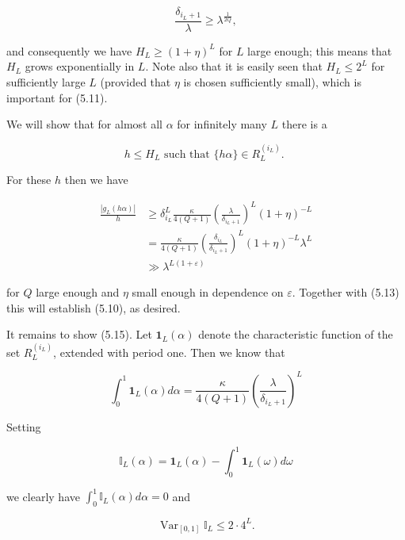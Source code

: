 \documentclass[10pt]{article}
\newcommand{\1}{\mathbf{1}}
\begin{document}
$$
\frac{\delta_{i_{L}+1}}{\lambda} \geqslant \lambda^{\frac{1}{2 Q}},
$$

and consequently we have $H_{L} \geqslant(1+\eta)^{L}$ for $L$ large enough; this means that $H_{L}$ grows exponentially in $L$. Note also that it is easily seen that $H_{L} \leqslant 2^{L}$ for sufficiently large $L$ (provided that $\eta$ is chosen sufficiently small), which is important for (5.11).

We will show that for almost all $\alpha$ for infinitely many $L$ there is a


\begin{equation*}
h \leqslant H_{L} \text { such that }\{h \alpha\} \in R_{L}^{\left(i_{L}\right)} \text {. } \tag{5.15}
\end{equation*}


For these $h$ then we have

$$
\begin{aligned}
\frac{\left|g_{L}(h \alpha)\right|}{h} & \geqslant \delta_{i_{L}}^{L} \frac{\kappa}{4(Q+1)}\left(\frac{\lambda}{\delta_{i_{L}+1}}\right)^{L}(1+\eta)^{-L} \\
& =\frac{\kappa}{4(Q+1)}\left(\frac{\delta_{i_{L}}}{\delta_{i_{L}+1}}\right)^{L}(1+\eta)^{-L} \lambda^{L} \\
& \gg \lambda^{L(1+\varepsilon)}
\end{aligned}
$$

for $Q$ large enough and $\eta$ small enough in dependence on $\varepsilon$. Together with (5.13) this will establish (5.10), as desired.

It remains to show (5.15). Let $\mathbf{1}_{L}(\alpha)$ denote the characteristic function of the set $R_L^{(i_L)}$, extended with period one. Then we know that


\begin{equation*}
\int_{0}^{1} \mathbf{1}_{L}(\alpha) d \alpha=\frac{\kappa}{4(Q+1)}\left(\frac{\lambda}{\delta_{i_{L}+1}}\right)^{L} \tag{5.16}
\end{equation*}


Setting

$$
\mathbb{I}_{L}(\alpha)=\mathbf{1}_{L}(\alpha)-\int_{0}^{1} \mathbf{1}_{L}(\omega) d \omega
$$

we clearly have $\int_{0}^{1} \mathbb{I}_{L}(\alpha) d \alpha=0$ and


\begin{equation*}
\operatorname{Var}_{[0,1]}\mathbb I_L\leqslant2\cdot4^L . \tag{5.17}
\end{equation*}
\end{document}
